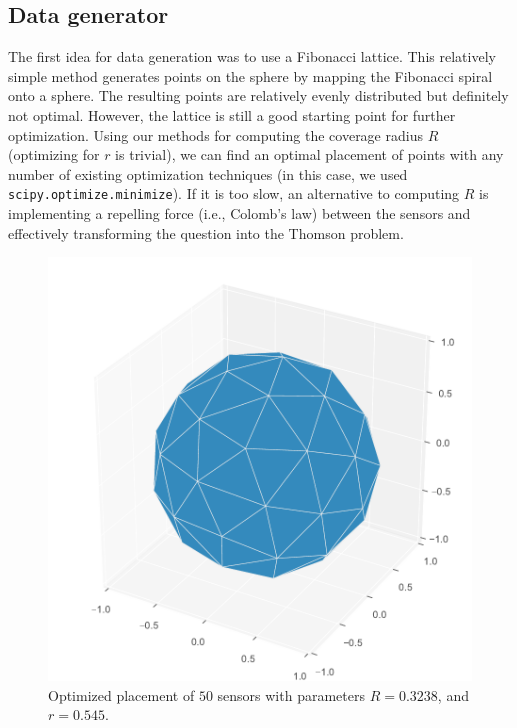 \documentclass[twocolumn]{article}
\begin{document}
\subsection{Data generator}
The first idea for data generation was to use a Fibonacci lattice. This relatively simple method generates points on the sphere by mapping the Fibonacci spiral onto a sphere. The resulting points are relatively evenly distributed but definitely not optimal. However, the lattice is still a good starting point for further optimization. Using our methods for computing the coverage radius $R$ (optimizing for $r$ is trivial), we can find an optimal placement of points with any number of existing optimization techniques (in this case, we used \texttt{scipy.optimize.minimize}).
If it is too slow, an alternative to computing $R$ is implementing a repelling force (i.e., Colomb's law) between the sensors and effectively transforming the question into the Thomson problem.

\begin{figure}[H]
    \centering
    \includegraphics[width=\columnwidth]{fig/optimised}
    \caption{Optimized placement of $50$ sensors with parameters $R = 0.3238$, and $r = 0.545$.}
    \label{fig:optimised}
\end{figure}
\end{document}
